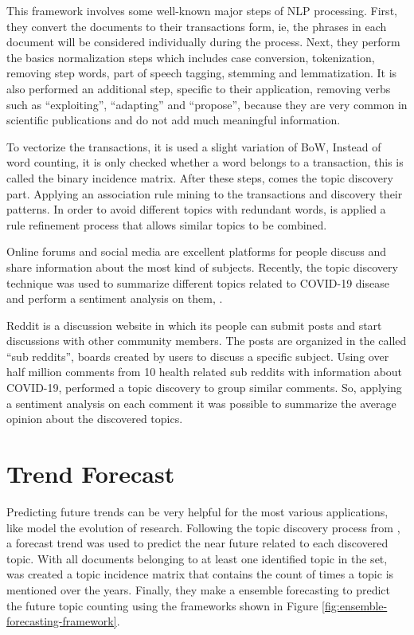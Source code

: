 This framework involves some well-known major steps of NLP processing. First, they convert the documents to their transactions form, ie, the phrases in each document will be considered individually during the process. Next, they perform the basics normalization steps which includes case conversion, tokenization, removing step words, part of speech tagging, stemming and lemmatization. It is also performed an additional step, specific to their application, removing verbs such as ``exploiting'', ``adapting'' and ``propose'', because they are very common in scientific publications and do not add much meaningful information.

To vectorize the transactions, it is used a slight variation of BoW, Instead of word counting, it is only checked whether a word belongs to a transaction, this is called the binary incidence matrix. After these steps, comes the topic discovery part. Applying an association rule mining to the transactions and discovery their patterns. In order to avoid different topics with redundant words, is applied a rule refinement process that allows similar topics to be combined.

Online forums and social media are excellent platforms for people discuss and share information about the most kind of subjects. Recently, the topic discovery technique was used to summarize different topics related to COVID-19 disease and perform a sentiment analysis on them, \cite{jelodar2020deep}.

Reddit is a discussion website in which its people can submit posts and start discussions with other community members. The posts are organized in the called ``sub reddits'', boards created by users to discuss a specific subject. Using over half million comments from 10 health related sub reddits with information about COVID-19,  performed a topic discovery to group similar comments. So, applying a sentiment analysis on each comment it was possible to summarize the average opinion about the discovered topics.


\section{Trend Forecast}

Predicting future trends can be very helpful for the most various applications, like model the evolution of research. Following the topic discovery process from , a forecast trend was used to predict the near future related to each discovered topic. With all documents belonging to at least one identified topic in the set, was created a topic incidence matrix that contains the count of times a topic is mentioned over the years. Finally, they make a ensemble forecasting to predict the future topic counting using the frameworks shown in Figure \ref{fig:ensemble-forecasting-framework}.

